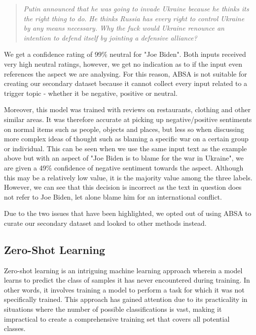 \begin{quote}
    \textit{Putin announced that he was going to invade Ukraine because he thinks its the right thing to do. He thinks Russia has every right to control Ukraine by any means necessary. Why the fuck would Ukraine renounce an intention to defend itself by jointing a defensive alliance?}
\end{quote}

We get a confidence rating of 99\% neutral for "Joe Biden". Both inputs received very high neutral ratings, however, we get no indication as to if the input even references the aspect we are analysing. For this reason, ABSA is not suitable for creating our secondary dataset because it cannot collect every input related to a trigger topic - whether it be negative, positive or neutral.

Moreover, this model was trained with reviews on restaurants, clothing and other similar areas. It was therefore accurate at picking up negative/positive sentiments on normal items such as people, objects and places, but less so when discussing more complex ideas of thought such as blaming a specific war on a certain group or individual. This can be seen when we use the same input text as the example above but with an aspect of "Joe Biden is to blame for the war in Ukraine", we are given a 49\% confidence of negative sentiment towards the aspect. Although this may be a relatively low value, it is the majority value among the three labels. However, we can see that this decision is incorrect as the text in question does not refer to Joe Biden, let alone blame him for an international conflict.

Due to the two issues that have been highlighted, we opted out of using ABSA to curate our secondary dataset and looked to other methods instead.

\subsection{Zero-Shot Learning}
\label{zero_shot}

Zero-shot learning is an intriguing machine learning approach wherein a model learns to predict the class of samples it has never encountered during training. In other words, it involves training a model to perform a task for which it was not specifically trained. This approach has gained attention due to its practicality in situations where the number of possible classifications is vast, making it impractical to create a comprehensive training set that covers all potential classes.

